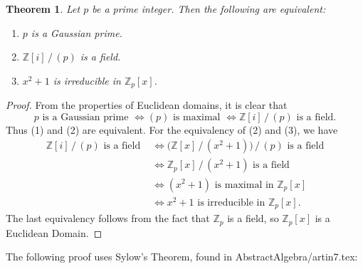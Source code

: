 \documentclass[11pt]{article}
\newtheorem{theorem}{Theorem}
\begin{document}
\begin{adjustwidth}{0.5cm}{}
  \begin{theorem}
    Let $p$ be a prime integer. Then the following are equivalent:
    \begin{enumerate}
      \item $p$ is a Gaussian prime.
      \item $\mathbb{Z}[i] \, / \, (p)$ is a field.
      \item $x^{2} + 1$ is irreducible in $\mathbb{Z}_{p}[x]$.
    \end{enumerate}
  \end{theorem}
  \begin{proof}
    From the properties of Euclidean domains, it is clear that
    \[
      p \text{ is a Gaussian prime } \iff (p) \text{ is maximal } \iff \mathbb{Z}[i] \, / \, (p) \text{ is a field}.
    \]
    Thus (1) and (2) are equivalent. For the equivalency of (2) and (3), we have
    \begin{align*}
      \mathbb{Z}[i] \, / \, (p) \text{ is a field } & \iff \big( \mathbb{Z}[x] \, / \, (x^{2} + 1) \big) \, / \, (p) \text{ is a field} \\
                                                    & \iff \mathbb{Z}_{p}[x] \, / \, (x^{2} + 1) \text{ is a field} \\
                                                    & \iff (x^{2} + 1) \text{ is maximal in } \mathbb{Z}_{p}[x] \\
                                                    & \iff x^{2} + 1 \text{ is irreducible in } \mathbb{Z}_{p}[x].
    \end{align*}
    The last equivalency follows from the fact that $\mathbb{Z}_{p}$ is a field, so $\mathbb{Z}_{p}[x]$ is a Euclidean Domain.
  \end{proof}
\end{adjustwidth}

The following proof uses Sylow's Theorem, found in AbstractAlgebra/artin7.tex:
\end{document}
